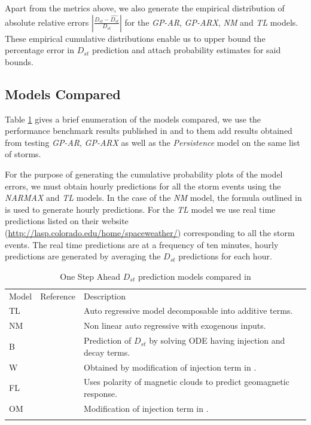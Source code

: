 \documentclass[referee,a4paper,12pt,traditabstract]{swsc}
\begin{document}
\begin{linenumbers}
Apart from the metrics above, we also generate the empirical distribution of absolute relative errors $|\frac{D_{st} - \hat{D_{st}}}{D_{st}}|$ for the \emph{GP-AR}, \emph{GP-ARX}, \emph{NM} and \emph{TL} models. These empirical cumulative distributions enable us to upper bound the percentage error in $D_{st}$ prediction and attach probability estimates for said bounds.


\subsection{Models Compared}

Table \ref{table:DstModels} gives a brief enumeration of the models compared, we use the performance benchmark results published in \citet{Ji2012} and to them add results obtained from testing \emph{GP-AR}, \emph{GP-ARX} as well as the \emph{Persistence} model on the same list of storms. 

For the purpose of generating the cumulative probability plots of the model errors, we must obtain hourly predictions for all the storm events using the \emph{NARMAX} and \emph{TL} models. In the case of the \emph{NM} model, the formula outlined in \citet{balikhin:narmax} is used to generate hourly predictions. For the \emph{TL} model we use real time predictions listed on their website (\url{http://lasp.colorado.edu/home/spaceweather/}) corresponding to all the storm events. The real time predictions are at a frequency of ten minutes, hourly predictions are generated by averaging the $D_{st}$ predictions for each hour.

\begin{table}
      \caption[]{One Step Ahead $D_{st}$ prediction models compared in \citet{Ji2012}}
         \label{table:DstModels}
      
         \begin{tabular}{lll}
            \hline
            \noalign{\smallskip}
            Model  &  Reference  &  Description \\
            \noalign{\smallskip}
            \hline
            \noalign{\smallskip}
            TL & \citet{JGRA:JGRA16300} & Auto regressive model decomposable into additive terms.      \\
            NM & \citet{balikhin:narmax} & Non linear auto regressive with exogenous inputs. \\
            B & \citet{JGR:JGR10260} & Prediction of $D_{st}$ by solving ODE having injection and decay terms. \\
            W & \citet{Wang:Dst} & Obtained by modification of injection term in \citet{JGR:JGR10260}. \\
            FL & \citet{GRL:GRL11549} & Uses polarity of magnetic clouds to predict geomagnetic response.\\
            OM & \citet{JGRA:JGRA14856} & Modification of injection term in \citet{JGR:JGR10260}.\\
            \noalign{\smallskip}
            \hline
         \end{tabular}
\end{table}


\end{linenumbers}
\end{document}
